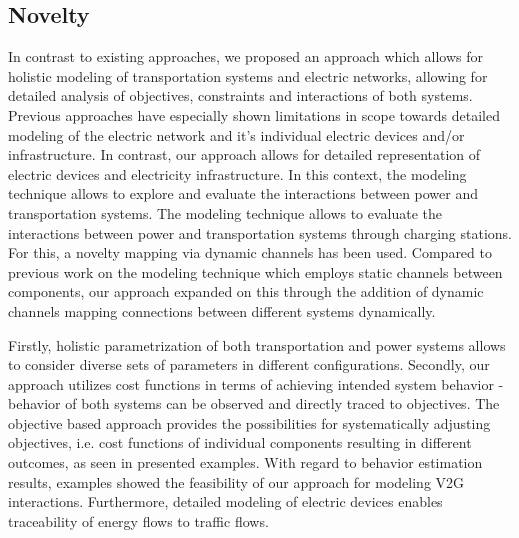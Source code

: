 \subsection{Novelty}

In contrast to existing approaches, we proposed an approach which allows for holistic modeling of transportation systems and electric networks, allowing for detailed analysis of objectives, constraints and interactions of both systems. Previous approaches have especially shown limitations in scope towards detailed modeling of the electric network and it's individual electric devices and/or infrastructure. In contrast, our approach allows for detailed representation of electric devices and electricity infrastructure. 
In this context, the modeling technique allows to explore and evaluate the interactions between power and transportation systems. 
The modeling technique allows to evaluate the interactions between power and transportation systems through charging stations. For this, a novelty mapping via dynamic channels has been used. Compared to previous work on the modeling technique which employs static channels between components, our approach expanded on this through the addition of dynamic channels mapping connections between different systems dynamically.

Firstly, holistic parametrization of both transportation and power systems allows to consider diverse sets of parameters in different configurations. Secondly, our approach utilizes cost functions in terms of achieving intended system behavior - behavior of both systems can be observed and directly traced to objectives. The objective based approach provides the possibilities for systematically adjusting objectives, i.e. cost functions of individual components resulting in different outcomes, as seen in presented examples. With regard to behavior estimation results, examples showed the feasibility of our approach for modeling V2G interactions. Furthermore, detailed modeling of electric devices enables traceability of energy flows to traffic flows.

